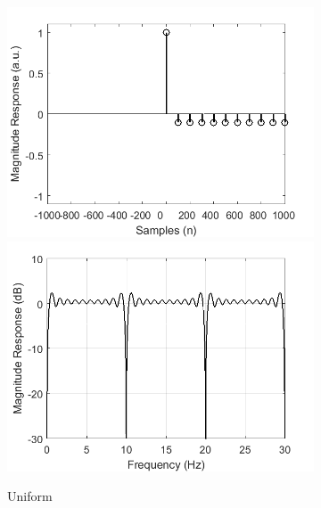 \documentclass[a4paper]{article}
\begin{document}
\begin{figure}[hbtp]
    \begin{subfigure}{.16\textwidth}
        \includegraphics[width=\textwidth]{img/causal/kernel_ave.png}\\
        \includegraphics[width=\textwidth]{img/causal/mag_ave.png}
        \caption{\scriptsize{Uniform}}\label{fig:UniformKernel}
    \end{subfigure}
    \begin{subfigure}{.16\textwidth}

\end{subfigure}
\end{figure}
\end{document}
